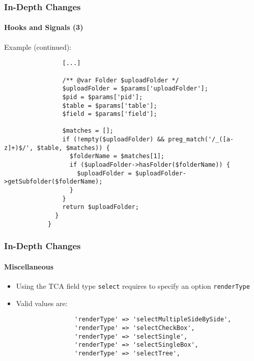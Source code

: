 \begin{frame}[fragile]
	\frametitle{In-Depth Changes}
	\framesubtitle{Hooks and Signals (3)}

	\lstset{basicstyle=\tiny\ttfamily}

	\small Example (continued):\normalsize

		\begin{lstlisting}
			    [...]

			    /** @var Folder $uploadFolder */
			    $uploadFolder = $params['uploadFolder'];
			    $pid = $params['pid'];
			    $table = $params['table'];
			    $field = $params['field'];

			    $matches = [];
			    if (!empty($uploadFolder) && preg_match('/_([a-z]+)$/', $table, $matches)) {
			      $folderName = $matches[1];
			      if ($uploadFolder->hasFolder($folderName)) {
			        $uploadFolder = $uploadFolder->getSubfolder($folderName);
			      }
			    }
			    return $uploadFolder;
			  }
			}
		\end{lstlisting}

\end{frame}

\begin{frame}[fragile]
	\frametitle{In-Depth Changes}
	\framesubtitle{Miscellaneous}

	\begin{itemize}

		\item Using the TCA field type \texttt{select} requires to specify an option \texttt{renderType}

		\item Valid values are:

			\begin{lstlisting}
				'renderType' => 'selectMultipleSideBySide',
				'renderType' => 'selectCheckBox',
				'renderType' => 'selectSingle',
				'renderType' => 'selectSingleBox',
				'renderType' => 'selectTree',
			\end{lstlisting}

	\end{itemize}

\end{frame}

